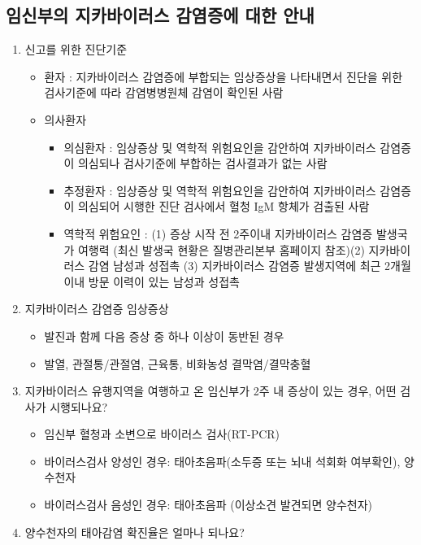 \subsection{임신부의 지카바이러스 감염증에 대한 안내}
\begin{enumerate}[1.]\tightlist
\item 신고를 위한 진단기준
	\begin{itemize}[→]\tightlist
	\item 환자 : 지카바이러스 감염증에 부합되는 임상증상을 나타내면서 진단을 위한 검사기준에 따라 감염병병원체 감염이 확인된 사람
	\item 의사환자
		\begin{itemize}[-]\tightlist
		\item 의심환자 : 임상증상 및 역학적 위험요인을 감안하여 지카바이러스  감염증이 의심되나 검사기준에 부합하는 검사결과가 없는 사람
		\item 추정환자 : 임상증상 및 역학적 위험요인을 감안하여 지카바이러스 감염증이 의심되어 시행한 진단 검사에서 혈청 IgM 항체가 검출된 사람
		\item 역학적 위험요인 : (1) 증상 시작 전 2주이내  지카바이러스 감염증 발생국가 여행력 (최신 발생국 현황은 질병관리본부 홈페이지 참조)(2) 지카바이러스 감염 남성과 성접촉 (3) 지카바이러스 감염증 발생지역에 최근 2개월 이내 방문 이력이 있는 남성과 성접촉
		\end{itemize}
	\end{itemize}	
\item 지카바이러스 감염증 임상증상
	\begin{itemize}[→]\tightlist
	\item 발진과 함께 다음 증상 중 하나 이상이 동반된 경우
	\item 발열, 관절통/관절염, 근육통, 비화농성 결막염/결막충혈
	\end{itemize}
\item 지카바이러스 유행지역을 여행하고 온 임신부가 2주 내 증상이 있는 경우, 어떤 검사가 시행되나요?
	\begin{itemize}[→]\tightlist
	\item 임신부 혈청과 소변으로 바이러스 검사(RT-PCR) 
	\item 바이러스검사 양성인 경우: 태아초음파(소두증 또는 뇌내 석회화 여부확인), 양수천자
	\item 바이러스검사 음성인 경우: 태아초음파 (이상소견 발견되면 양수천자)
	\end{itemize}
\item 양수천자의 태아감염 확진율은 얼마나 되나요?
	\begin{itemize}[→]\tightlist

\end{itemize}
\end{enumerate}
